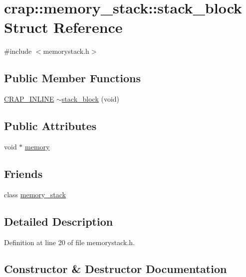 \hypertarget{structcrap_1_1memory__stack_1_1stack__block}{}\section{crap\+:\+:memory\+\_\+stack\+:\+:stack\+\_\+block Struct Reference}
\label{structcrap_1_1memory__stack_1_1stack__block}


{\ttfamily \#include $<$memorystack.\+h$>$}

\subsection*{Public Member Functions}
\begin{DoxyCompactItemize}
\item 
\hyperlink{config__x86_8h_a5a40526b8d842e7ff731509998bb0f1c}{C\+R\+A\+P\+\_\+\+I\+N\+L\+I\+N\+E} \hyperlink{structcrap_1_1memory__stack_1_1stack__block_aa066e125b0ec790abc0ef1698266c734}{$\sim$stack\+\_\+block} (void)
\end{DoxyCompactItemize}
\subsection*{Public Attributes}
\begin{DoxyCompactItemize}
\item 
void $\ast$ \hyperlink{structcrap_1_1memory__stack_1_1stack__block_a8c47af0e38c75271a11e2b29f963cc99}{memory}
\end{DoxyCompactItemize}
\subsection*{Friends}
\begin{DoxyCompactItemize}
\item 
class \hyperlink{structcrap_1_1memory__stack_1_1stack__block_a290fed5bdf739cd689a3119b9104965e}{memory\+\_\+stack}
\end{DoxyCompactItemize}


\subsection{Detailed Description}


Definition at line 20 of file memorystack.\+h.



\subsection{Constructor \& Destructor Documentation}
\hypertarget{structcrap_1_1memory__stack_1_1stack__block_aa066e125b0ec790abc0ef1698266c734}{}
